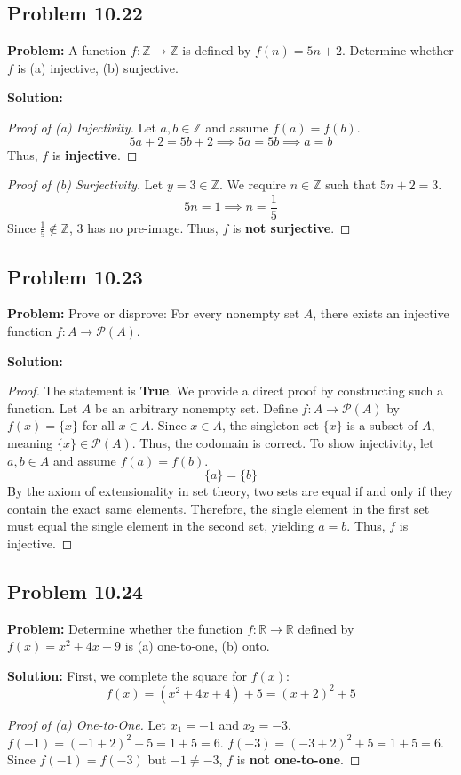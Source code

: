 \documentclass[11pt, a4paper]{article}
\theoremstyle{definition}
\theoremstyle{remark}
\newcommand{\R}{\mathbb{R}}
\newcommand{\Z}{\mathbb{Z}}
\begin{document}
\subsection{Problem 10.22}
\textbf{Problem:} A function $f: \Z \to \Z$ is defined by $f(n) = 5n + 2$. Determine whether $f$ is (a) injective, (b) surjective.

\textbf{Solution:}
\begin{proof}[Proof of (a) Injectivity]
Let $a, b \in \Z$ and assume $f(a) = f(b)$. 
\[ 5a + 2 = 5b + 2 \implies 5a = 5b \implies a = b \]
Thus, $f$ is \textbf{injective}.
\end{proof}

\begin{proof}[Proof of (b) Surjectivity]
Let $y = 3 \in \Z$. We require $n \in \Z$ such that $5n + 2 = 3$.
\[ 5n = 1 \implies n = \frac{1}{5} \]
Since $\frac{1}{5} \notin \Z$, $3$ has no pre-image. Thus, $f$ is \textbf{not surjective}.
\end{proof}

\subsection{Problem 10.23}
\textbf{Problem:} Prove or disprove: For every nonempty set $A$, there exists an injective function $f: A \to \mathcal{P}(A)$.

\textbf{Solution:}
\begin{proof}
The statement is \textbf{True}. We provide a direct proof by constructing such a function.
Let $A$ be an arbitrary nonempty set. Define $f: A \to \mathcal{P}(A)$ by $f(x) = \{x\}$ for all $x \in A$. 
Since $x \in A$, the singleton set $\{x\}$ is a subset of $A$, meaning $\{x\} \in \mathcal{P}(A)$. Thus, the codomain is correct.
To show injectivity, let $a, b \in A$ and assume $f(a) = f(b)$. 
\[ \{a\} = \{b\} \]
By the axiom of extensionality in set theory, two sets are equal if and only if they contain the exact same elements. Therefore, the single element in the first set must equal the single element in the second set, yielding $a = b$. 
Thus, $f$ is injective.
\end{proof}

\subsection{Problem 10.24}
\textbf{Problem:} Determine whether the function $f: \R \to \R$ defined by $f(x) = x^2 + 4x + 9$ is (a) one-to-one, (b) onto.

\textbf{Solution:}
First, we complete the square for $f(x)$:
\[ f(x) = (x^2 + 4x + 4) + 5 = (x+2)^2 + 5 \]
\begin{proof}[Proof of (a) One-to-One]
Let $x_1 = -1$ and $x_2 = -3$. 
$f(-1) = (-1+2)^2 + 5 = 1 + 5 = 6$.
$f(-3) = (-3+2)^2 + 5 = 1 + 5 = 6$.
Since $f(-1) = f(-3)$ but $-1 \neq -3$, $f$ is \textbf{not one-to-one}.
\end{proof}
\end{document}
